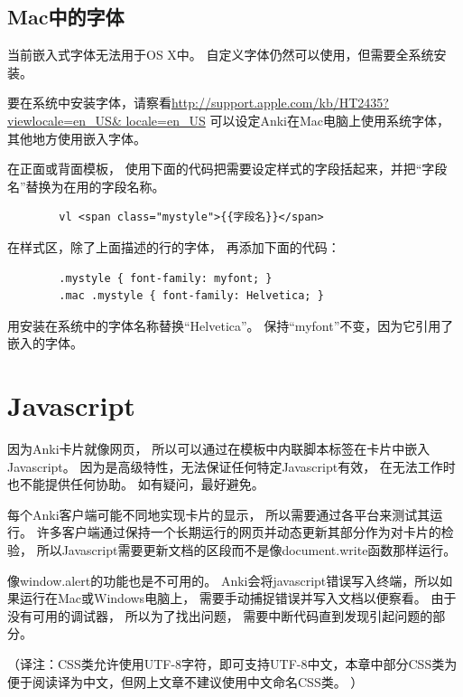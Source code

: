 \documentclass[a4paper]{book}
\begin{document}
	\subsection{Mac中的字体}
	
	当前嵌入式字体无法用于OS X中。 自定义字体仍然可以使用，但需要全系统安装。
	
	要在系统中安装字体，请察看\url{http://support.apple.com/kb/HT2435?viewlocale=en_US\& locale=en_US}
	可以设定Anki在Mac电脑上使用系统字体， 其他地方使用嵌入字体。
	
	在正面或背面模板， 使用下面的代码把需要设定样式的字段括起来，并把“字段名”替换为在用的字段名称。
	
	\begin{shaded}\begin{verbatim}
		vl <span class="mystyle">{{字段名}}</span>
		\end{verbatim}\end{shaded}
	
	在样式区，除了上面描述的行的字体， 再添加下面的代码：
	
	\begin{shaded}\begin{verbatim}
		.mystyle { font-family: myfont; }
		.mac .mystyle { font-family: Helvetica; }
		\end{verbatim}\end{shaded}
	
	用安装在系统中的字体名称替换“Helvetica”。 保持“myfont”不变，因为它引用了嵌入的字体。
	
	\section{Javascript}
	
	因为Anki卡片就像网页， 所以可以通过在模板中内联脚本标签在卡片中嵌入Javascript。 因为是高级特性，无法保证任何特定Javascript有效， 在无法工作时也不能提供任何协助。 如有疑问，最好避免。
	
	每个Anki客户端可能不同地实现卡片的显示， 所以需要通过各平台来测试其运行。 许多客户端通过保持一个长期运行的网页并动态更新其部分作为对卡片的检验， 所以Javascript需要更新文档的区段而不是像document.write函数那样运行。
	
	像window.alert的功能也是不可用的。 Anki会将javascript错误写入终端，所以如果运行在Mac或Windows电脑上， 需要手动捕捉错误并写入文档以便察看。 由于没有可用的调试器， 所以为了找出问题， 需要中断代码直到发现引起问题的部分。
	
	（译注：CSS类允许使用UTF-8字符，即可支持UTF-8中文，本章中部分CSS类为便于阅读译为中文，但网上文章不建议使用中文命名CSS类。 ）
	
\end{document}
